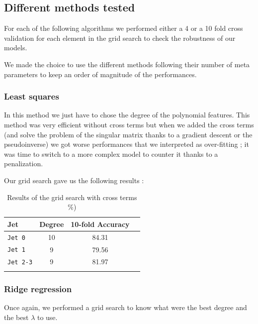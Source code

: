 \documentclass[10pt,conference,compsocconf]{IEEEtran}
\begin{document}
\subsection{Different methods tested}

For each of the following algorithms we performed either a 4 or a 10 fold cross validation for each element in the grid search to check the robustness of our models.

We made the choice to use the different methods following their number of meta parameters to keep an order of magnitude of the performances.

\subsubsection{Least squares}

In this method we just have to chose the degree of the polynomial features. This method was very efficient without cross terms but when we added the cross terms (and solve the problem of the singular matrix thanks to a gradient descent or the pseudoinverse) we got worse performances that we interpreted as over-fitting ; it was time to switch to a more complex model to counter it thanks to a penalization.

Our grid search gave us the following results : 

\begin{table}[h!]
\centering
\caption{Results of the grid search with cross terms \%)}
\footnotesize
\hspace{-0.2cm}
\begin{tabular}{ l| ccc } 
 \hline
   Jet & Degree & 10-fold Accuracy  \\
 \hline
   \verb+Jet 0+  & 10 &  84.31 \\
   \verb+Jet 1+  & 9 & 79.56 \\
   \verb+Jet 2-3+  & 9 & 81.97 \\
  \hline
\label{grid_search_ridge_cross}
\end{tabular}
\end{table}


\subsubsection{Ridge regression}

Once again, we performed a grid search to know what were the best degree and the best $\lambda$ to use.
\end{document}
